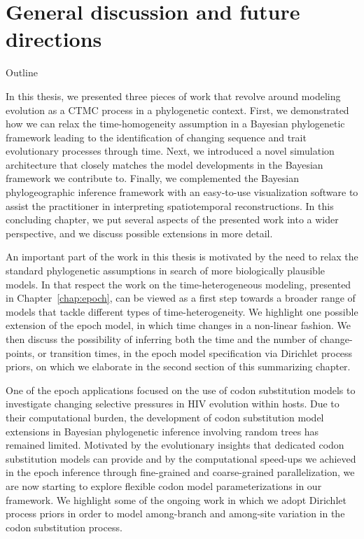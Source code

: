 \chapter{General discussion and future directions\label{chap:discussion}}

\begin{remark}{Outline}

In this thesis, we presented three pieces of work that revolve around modeling evolution as a CTMC process in a phylogenetic context. 
First, we demonstrated how we can relax the time-homogeneity assumption in a Bayesian phylogenetic framework leading to the identification of changing sequence and trait evolutionary processes through time.
Next, we introduced a novel simulation architecture that closely matches the model developments in the Bayesian framework we contribute to.
Finally, we complemented the Bayesian phylogeographic inference framework with an easy-to-use visualization software to assist the practitioner in interpreting spatiotemporal reconstructions.
In this concluding chapter, we put several aspects of the presented work into a wider perspective, and we discuss possible extensions in more detail. 

An important part of the work in this thesis is motivated by the need to relax the standard phylogenetic assumptions in search of more biologically plausible models. 
In that respect the work on the time-heterogeneous modeling, presented in Chapter~\ref{chap:epoch}, can be viewed as a first step towards a broader range of models that tackle different types of time-heterogeneity.
We highlight one possible extension of the epoch model, in which time changes in a non-linear fashion.
We then discuss the possibility of inferring both the time and the number of change-points, or transition times, in the epoch model specification via Dirichlet process priors, on which we elaborate in the second section of this summarizing chapter. 

One of the epoch applications focused on the use of codon substitution models to investigate changing selective pressures in HIV evolution within hosts.
Due to their computational burden, the development of codon substitution model extensions in Bayesian phylogenetic inference involving random trees has remained limited.
Motivated by the evolutionary insights that dedicated codon substitution models can provide and by the computational speed-ups we achieved in the epoch inference through fine-grained and coarse-grained parallelization, we are now starting to explore flexible codon model parameterizations in our framework.  
We highlight some of the ongoing work in which we adopt Dirichlet process priors in order to model among-branch and among-site variation in the codon substitution process.


\end{remark}

